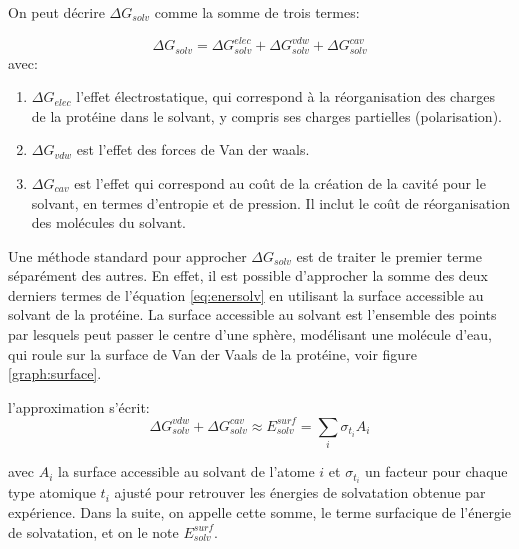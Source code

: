 On peut décrire $\Delta G_{solv}$ comme la somme de trois termes:

\begin{equation}
  \label{eq:enersolv}
  \Delta G_{solv} = \Delta G_{solv}^{elec} + \Delta G_{solv}^{vdw} + \Delta G_{solv}^{cav}
\end{equation}
avec:

\begin{enumerate}
\item $\Delta G_{elec}$ l'effet électrostatique, qui correspond à la réorganisation des charges de la protéine dans le solvant, y compris ses charges partielles (polarisation).
\item $\Delta G_{vdw}$ est l'effet des forces de Van der waals.
  \item $\Delta G_{cav}$ est l'effet qui correspond au coût de la création de la cavité pour le solvant, en termes d'entropie et de pression. Il inclut le coût de réorganisation des molécules du solvant.
\end{enumerate}

Une méthode standard pour approcher $\Delta G_{solv}$ est de traiter le premier terme séparément des autres. En effet, il est possible d'approcher la somme des deux derniers termes de l'équation  \ref{eq:enersolv} en utilisant la surface accessible au solvant de la protéine. La surface accessible au solvant est l'ensemble des points par lesquels peut passer le centre d'une sphère, modélisant une molécule d'eau, qui roule sur la surface de Van der Vaals de la protéine, voir figure \ref{graph:surface}.

l'approximation s'écrit:
\begin{equation}
  \label{eq:SA}
\Delta G_{solv}^{vdw} + \Delta G_{solv}^{cav} \approx E_{solv}^{surf} = \sum_i \sigma_{t_i} A_i
\end{equation}

avec $A_i$ la surface accessible au solvant de l'atome $i$  et $\sigma_{t_i}$ un facteur pour chaque type atomique $t_i$ ajusté pour retrouver les énergies de solvatation obtenue par expérience.
Dans la suite, on appelle cette somme, le terme surfacique de l'énergie de solvatation, et on le note $E_{solv}^{surf}$.

